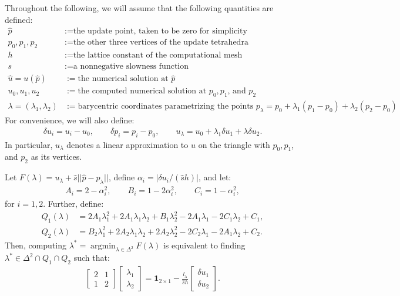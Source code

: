 \documentclass{article}
\begin{document}
Throughout the following, we will assume that the following quantities
are defined:
\begin{align*}
  \hat{p} &:= \text{the update point, taken to be zero for simplicity} \\
  p_0, p_1, p_2 &:= \text{the other three vertices of the update tetrahedra} \\
  h &:= \text{the lattice constant of the computational mesh} \\
  s &:= \text{a nonnegative slowness function} \\
  \hat{u} = u(\hat{p}) &:= \text{the numerical solution at $\hat{p}$} \\
  u_0, u_1, u_2 &:= \text{the computed numerical solution at $p_0, p_1$, and $p_2$} \\
  \lambda = (\lambda_1, \lambda_2) &:= \text{barycentric coordinates parametrizing the points $p_\lambda = p_0 + \lambda_1 (p_1 - p_0) + \lambda_2 (p_2 - p_0)$}
\end{align*}
For convenience, we will also define:
\begin{align*}
  \delta u_i = u_i - u_0, \qquad \delta p_i = p_i - p_0, \qquad u_\lambda = u_0 + \lambda_1 \delta u_1 + \lambda \delta u_2.
\end{align*}
In particular, $u_\lambda$ denotes a linear approximation to $u$ on
the triangle with $p_0, p_1$, and $p_2$ as its vertices.

\begin{lemma}
  Let $F(\lambda) = u_\lambda + \hat{s} ||\hat{p} - p_\lambda||$,
  define $\alpha_i = |\delta u_i/(\hat{s} h)|$, and let:
  \begin{align*}
    A_i = 2 - \alpha_i^2, \qquad B_i = 1 - 2\alpha_i^2, \qquad C_i = 1 - \alpha_i^2,
  \end{align*}
  for $i = 1, 2$. Further, define:
  \begin{align*}
    Q_1(\lambda) &= 2A_1\lambda_1^2 + 2A_1\lambda_1\lambda_2 + B_1\lambda_2^2 -2A_1\lambda_1 -2C_1\lambda_2 + C_1, \\
    Q_2(\lambda) &= B_2\lambda_1^2 + 2A_2\lambda_1\lambda_2 + 2A_2\lambda_2^2 -2C_2\lambda_1 -2A_1\lambda_2 + C_2.
  \end{align*}
  Then, computing
  $\lambda^* = \operatorname{argmin}_{\lambda \in \Delta^2}
  F(\lambda)$ is equivalent to finding
  $\lambda^* \in \Delta^2 \cap Q_1 \cap Q_2$ such that:
  \begin{align*}
    \begin{bmatrix}
      2 & 1 \\ 1 & 2
    \end{bmatrix} \begin{bmatrix}
      \lambda_1 \\ \lambda_2
    \end{bmatrix} = \boldsymbol{1}_{2 \times 1} - \frac{l_\lambda}{\hat{s} h} \begin{bmatrix}
      \delta u_1 \\ \delta u_2
    \end{bmatrix}.
  \end{align*}
\end{lemma}
\end{document}
